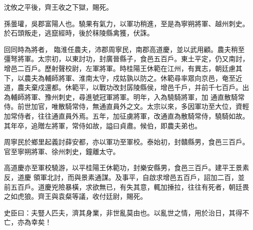 \begin{pinyinscope}
 沈攸之平後，齊王收之下獄，賜死。



 孫曇瓘，吳郡富陽人也。驍果有氣力，以軍功稍進，至是為寧朔將軍、越州刺史。於石頭叛走，逃竄經時，後於秣陵縣禽獲，伏誅。



 回同時為將者，
 臨淮任農夫，沛郡周寧民，南郡高道慶，並以武用顧。農夫稍至彊弩將軍。太宗初，以東討功，封廣晉縣子，食邑五百戶。東土平定，仍又南討，增邑二百戶。歷射聲校尉，左軍將軍。時桂陽王休範在江州，有異志，朝廷慮其下，以農夫為輔師將軍、淮南太守，戍姑孰以防之。休範尋率眾向京邑，奄至近道，農夫棄戍還都。休範平，以戰功改封孱陵縣侯，增邑千戶，并前千七百戶。出為輔師將軍、豫州刺史，尋進號冠軍將軍。明年，入為驍騎將軍，加
 通直散騎常侍。前世加官，唯散騎常侍，無通直員外之文。太宗以來，多因軍功至大位，資輕加常侍者，往往通直員外焉。五年，加征虜將軍，改通直為散騎常侍，驍騎如故。其年卒，追贈左將軍，常侍如故，謚曰貞肅。候伯，即農夫弟也。



 周寧民於鄉里起義討薛安都，亦以軍功至軍校。泰始初，封贛縣男，食邑三百戶。官至寧朔將軍、徐州刺史，鐘離太守。



 高道慶亦至軍校驍游，以平桂陽王休範功，封樂安縣男，食邑三百戶。建平王景素反，道慶
 領軍北討，而與景素通謀。及事平，自啟求增邑五百戶，詔加二百，並前五百戶。道慶兇險暴橫，求欲無已，有失其意，輒加捶拉，往往有死者，朝廷畏之如虎狼。齊王與袁粲等議，收付廷尉，賜死。



 史臣曰：夫豎人匹夫，濟其身業，非世亂莫由也。以亂世之情，用於治日，其得不亡，亦為幸矣！



\end{pinyinscope}